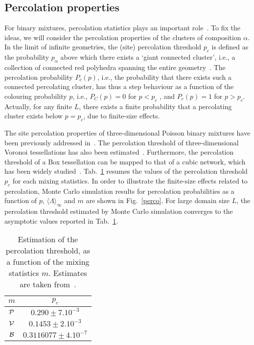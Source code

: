 \documentclass[final,authoryear,5p,times,twocolumn]{elsarticle}
\begin{document}
\subsection{Percolation properties}

For binary mixtures, percolation statistics plays an important role~\cite{larmier, lepage}. To fix the ideas, we will consider the percolation properties of the clusters of composition $\alpha$. In the limit of infinite geometries, the (site) percolation threshold $p_c$ is defined as the probability $p_\alpha$ above which there exists a `giant connected cluster', i.e., a collection of connected red polyhedra spanning the entire geometry~\cite{percolation_book}. The percolation probability $P_c(p)$, i.e., the probability that there exists such a connected percolating cluster, has thus a step behaviour as a function of the colouring probability $p$, i.e., $P_C (p) = 0$ for $ p < p_c$ , and $P_c(p) = 1$ for $p > p_c$. Actually, for any finite $L$, there exists a finite probability that a percolating cluster exists below $p = p_c$, due to finite-size effects.

The site percolation properties of three-dimensional Poisson binary mixtures have been previously addressed in~\cite{larmier}. The percolation threshold of three-dimensional Voronoi tessellations has also been estimated~\cite{voronoi_perco}. Furthermore, the percolation threshold of a Box tessellation can be mapped to that of a cubic network, which has been widely studied~\cite{ortho_perco}. Tab.~\ref{tab_perco} resumes the values of the percolation threshold $p_c$ for each mixing statistics. In order to illustrate the finite-size effects related to percolation, Monte Carlo simulation results for percolation probabilities as a function of $p$, ${\langle \Lambda \rangle}_{\infty}$ and $m$ are shown in Fig.~\ref{perco}. For large domain size $L$, the percolation threshold estimated by Monte Carlo simulation converges to the asymptotic values reported in Tab.~\ref{tab_perco}.

\begin{table}[b]
\begin{center}
\begin{tabular}{cc}
\toprule
$m$ & $p_c$\\
\midrule
${\cal P}$ & $0.290 \pm 7.10^{-3}$ \\
${\cal V}$ &  $0.1453 \pm 2.10^{-3}$ \\
${\cal B}$ & $0.3116077 \pm 4.10^{-7} $ \\
\bottomrule
\end{tabular}
\end{center}
\caption{Estimation of the percolation threshold, as a function of the mixing statistics $m$. Estimates are taken from~\cite{larmier, voronoi_perco, ortho_perco}.}
\label{tab_perco}
\end{table}
\end{document}
